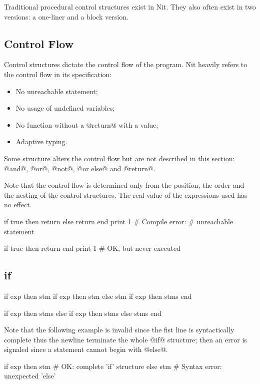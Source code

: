 Traditional procedural control structures exist in Nit.
They also often exist in two versions: a one-liner and a block version.

\subsection{Control Flow}\label{control flow}

Control structures dictate the control flow of the program.
Nit heavily refers to the control flow in its specification:
\begin{itemize}
\item No unreachable statement;
\item No usage of undefined variables;
\item No function without a @return@ with a value;
\item Adaptive typing.
\end{itemize}

Some structure alters the control flow but are not described in this section: @and@, @or@, @not@, @or else@ and @return@.

Note that the control flow is determined only from the position, the order and the nesting of the control structures.
The real value of the expressions used has no effect.
\begin{multicols}{2}
\begin{lst}
if true then
	return
else
	return
end
print 1
# Compile error: 
# unreachable statement
\end{lst}
\columnbreak
\begin{lst}
if true then
	return
end
print 1
# OK, but never executed
\end{lst}
\end{multicols}

\subsection{if}\label{if}

\begin{multicols}{2}
\begin{lst}
if exp then stm
if exp then stm else stm
if exp then
	stms
end
\end{lst}
\columnbreak
\begin{lst}
if exp then
	stms
else if exp then
	stms
else
	stms
end
\end{lst}
\end{multicols}
Note that the following example is invalid since the fist line is syntactically complete thus the newline terminate the whole @if@ structure; then an error is signaled since a statement cannot begin with @else@.
\begin{lst}
if exp then stm # OK: complete 'if' structure
else stm # Syntax error: unexpected 'else'
\end{lst}

